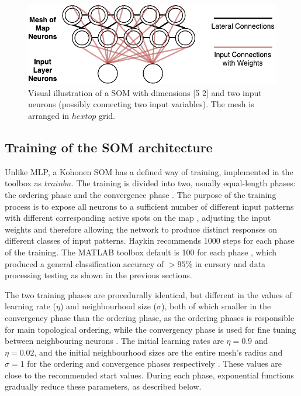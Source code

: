 \documentclass[10pt, oneside]{article}
\begin{document}
\begin{figure}[h]
\begin{center}
\includegraphics[width=12cm]{som-visual.pdf} 
\end{center}
\caption{\label{fig:som-visual} Visual illustration of a SOM with dimensions [5 2] and two input neurons (possibly connecting two input variables). The mesh is arranged in $hextop$ grid.}
\end{figure}

\subsection{Training of the SOM architecture} \label{subsec:training}
 
Unlike MLP, a Kohonen SOM has a defined way of training, implemented in the toolbox as $trainbu$. The training is divided into two, usually equal-length phases: the ordering phase and the convergence phase \cite[p. 23]{som-lecture}. The purpose of the training process is to expose all neurons to a sufficient number of different input patterns with different corresponding active spots on the map \cite[p. 429]{haykin2008}, adjusting the input weights and therefore allowing the network to produce distinct responses on different classes of input patterns. Haykin \cite[p. 435]{haykin2008} recommends 1000 steps for each phase of the training. The MATLAB toolbox default is 100 for each phase \cite{som-matlab}, which produced a general classification accuracy of $>95$\% in cursory and data processing testing as shown in the previous sections.

The two training phases are procedurally identical, but different in the values of learning rate ($\eta$) and neighbourhood size ($\sigma$), both of which smaller in the convergency phase than the ordering phase, as the ordering phases is responsible for main topological ordering, while the convergency phase is used for fine tuning between neighbouring neurons \cite[p. 23]{som-lecture}. The initial learning rates are $\eta=0.9$ and $\eta=0.02$, and the initial neighbourhood sizes are the entire mesh's radius and $\sigma=1$ for the ordering and convergence phases respectively \cite{newsom-matlab}. These values are close to the recommended start values\cite[p. 23]{som-lecture}. During each phase, exponential functions gradually reduce these parameters, as described below.
\end{document}

